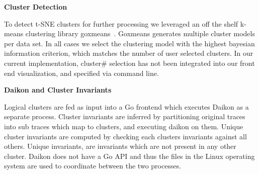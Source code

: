 \textbf{Cluster Detection}

To detect t-SNE clusters for further processing we leveraged an off
the shelf k-means clustering library goxmeans~\cite{goxmeans}. Goxmeans
generates multiple cluster models per data set. In all cases we select
the clustering model with the highest bayesian information criterion,
which matches the number of user selected clusters. In our current
implementation, cluster\# selection has not been integrated into our
front end visualization, and specified via command line.

\textbf{Daikon and Cluster Invariants}

Logical clusters are fed as input into a Go frontend which executes
Daikon as a separate process. Cluster invariants are inferred by
partitioning original traces into sub traces which map to clusters, and
executing daikon on them. Unique cluster invariants are computed by
checking each clusters invariants against all others. Unique
invariants, are invariants which are not present in any other cluster.
Daikon does not have a Go API and thus the files in the Linux
operating system are used to coordinate between the two processes.
